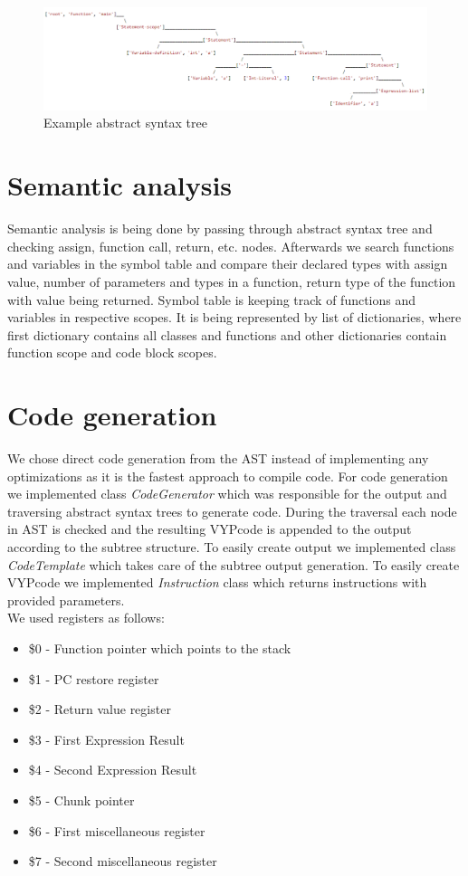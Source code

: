 \documentclass[12pt]{article}
\begin{document}
\begin{figure}[ht]
    \centering
    \includegraphics[scale=0.8]{images/ast.png}
    \caption{Example abstract syntax tree}
    \label{fig:ast}
\end{figure}

\section{Semantic analysis}
Semantic analysis is being done by passing through abstract syntax tree and checking assign, function call, return, etc. nodes. Afterwards we search functions and variables in the symbol table and compare their declared types with assign value, number of parameters and types in a function, return type of the function with value being returned. Symbol table is keeping track of functions and variables in respective scopes. It is being represented by list of dictionaries, where first dictionary contains all classes and functions and other dictionaries contain function scope and code block scopes.

\section{Code generation}
We chose direct code generation from the AST instead of implementing any optimizations as it is the fastest approach to compile code. For code generation we implemented class \emph{CodeGenerator} which was responsible for the output and traversing abstract syntax trees to generate code. During the traversal each node in AST is checked and the resulting VYPcode is appended to the output according to the subtree structure. To easily create output we implemented class \emph{CodeTemplate} which takes care of the subtree output generation. To easily create VYPcode we implemented \emph{Instruction} class which returns instructions with provided parameters.\\

We used registers as follows:
\begin{itemize}
  \item \$0 - Function pointer which points to the stack
  \item \$1 - PC restore register
  \item \$2 - Return value register
  \item \$3 - First Expression Result
  \item \$4 - Second Expression Result
  \item \$5 - Chunk pointer
  \item \$6 - First miscellaneous register
  \item \$7 - Second miscellaneous register
\end{itemize}
\end{document}
